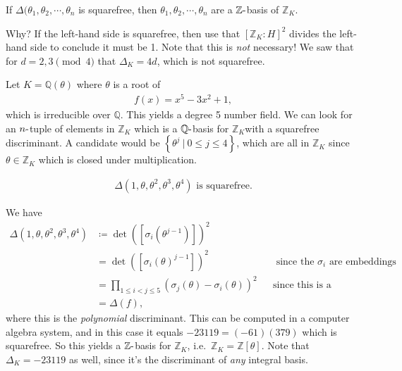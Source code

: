 \begin{corollary}

If \({\Delta}( { { \theta}_1, { \theta}_2, \cdots, { \theta}_{n}}\) is
squarefree, then \({ {\theta}_1, {\theta}_2, \cdots, {\theta}_{n}}\) are
a \({\mathbb{Z}}{\hbox{-}}\)basis of \({\mathbb{Z}}_K\).

\end{corollary}

\begin{remark}

Why? If the left-hand side is squarefree, then use that
\([{\mathbb{Z}}_K: H]^2\) divides the left-hand side to conclude it must
be 1. Note that this is \emph{not} necessary! We saw that for
\(d = 2,3 \pmod 4\) that \({\Delta}_K = 4d\), which is not squarefree.

\end{remark}

\begin{example}[?]

Let \(K = {\mathbb{Q}}( \theta)\) where \(\theta\) is a root of
\begin{align*}
f(x) = x^5 - 3x^2 + 1
,\end{align*}
which is irreducible over \({\mathbb{Q}}\). This yields a degree 5
number field. We can look for an \(n{\hbox{-}}\)tuple of elements in
\({\mathbb{Z}}_K\) which is a \({\mathbb{Q}}{\hbox{-}}\)basis for
\({\mathbb{Z}}_K\)with a squarefree discriminant. A candidate would be
\(\left\{{ \theta^j {~\mathrel{\Big|}~}0\leq j \leq 4 }\right\}\), which
are all in \({\mathbb{Z}}_K\) since \(\theta\in {\mathbb{Z}}_K\) which
is closed under multiplication.

\begin{claim}

\begin{align*}
{\Delta}( 1, \theta, \theta^2, \theta^3, \theta^4) \text{ is squarefree}
.\end{align*}

\end{claim}

We have
\begin{align*}
{\Delta}( 1, \theta, \theta^2, \theta^3, \theta^4)
&\coloneqq\det( {\left[ { \sigma_i ( \theta^{j-1} ) } \right]} )^2 \\
&= \det( {\left[ { \sigma_i ( \theta )^{j-1} } \right]} )^2 && \text{ since the $\sigma_i$ are embeddings } \\
&= \prod_{1\leq i < j \leq 5} ( \sigma_j( \theta) - \sigma_i( \theta ) )^2 &&\text{since this is a Vandermonde matrix}\\
&= {\Delta}(f)
,\end{align*}
where this is the \emph{polynomial} discriminant. This can be computed
in a computer algebra system, and in this case it equals
\(-23119 = (-61)(379)\) which is squarefree. So this yields a
\({\mathbb{Z}}{\hbox{-}}\)basis for \({\mathbb{Z}}_K\),
i.e.~\({\mathbb{Z}}_K = {\mathbb{Z}}[ \theta]\). Note that
\({\Delta}_K = -23119\) as well, since it's the discriminant of
\emph{any} integral basis.

\end{example}

